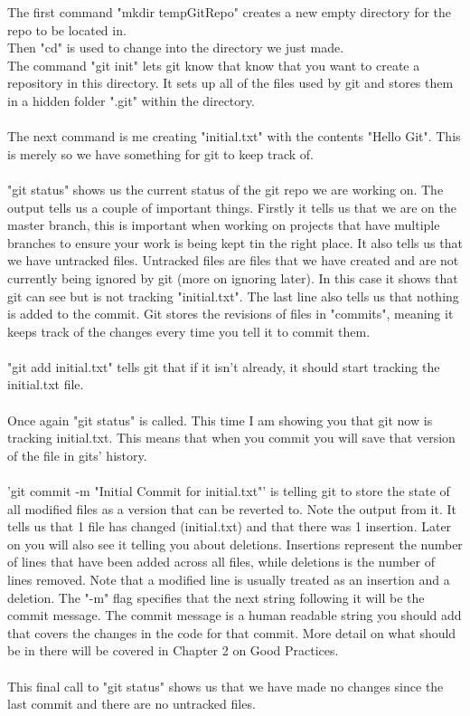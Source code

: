 \documentclass[a4paper,11pt]{report}
\begin{document}
\begin{description}
							The first command "mkdir tempGitRepo" creates a new empty directory for the repo to be located in.\\
							Then "cd" is used to change into the directory we just made.\\
							The command "git init" lets git know that know that you want to create a repository in this directory. It sets up all of the files used by git and stores them in a hidden folder ".git" within the directory.\\\\
							The next command is me creating "initial.txt" with the contents "Hello Git". This is merely so we have something for git to keep track of.\\\\
							"git status" shows us the current status of the git repo we are working on. The output tells us a couple of important things. Firstly it tells us that we are on the master branch, this is important when working on projects that have multiple branches to ensure your work is being kept tin the right place.
							It also tells us that we have untracked files. Untracked files are files that we have created and are not currently being ignored by git (more on ignoring later). In this case it shows that git can see but is not tracking "initial.txt".
							The last line also tells us that nothing is added to the commit. Git stores the revisions of files in "commits", meaning it keeps track of the changes every time you tell it to commit them.\\\\
							"git add initial.txt" tells git that if it isn't already, it should start tracking the initial.txt file.\\\\
							Once again "git status" is called. This time I am showing you that git now is tracking initial.txt. This means that when you commit you will save that version of the file in gits' history.\\\\
							'git commit -m "Initial Commit for initial.txt"' is telling git to store the state of all modified files as a version that can be reverted to. Note the output from it. It tells us that 1 file has changed (initial.txt) and that there was 1 insertion. Later on you will also see it telling you about deletions.
							Insertions represent the number of lines that have been added across all files, while deletions is the number of lines removed. Note that a modified line is usually treated as an insertion and a deletion.
							The "-m" flag specifies that the next string following it will be the commit message.  The commit message is a human readable string you should add that covers the changes in the code for that commit. More detail on what should be in there will be covered in Chapter 2 on Good Practices.\\\\
							This final call to "git status" shows us that we have made no changes since the last commit and there are no untracked files.\\\\\\


\end{description}
\end{document}
